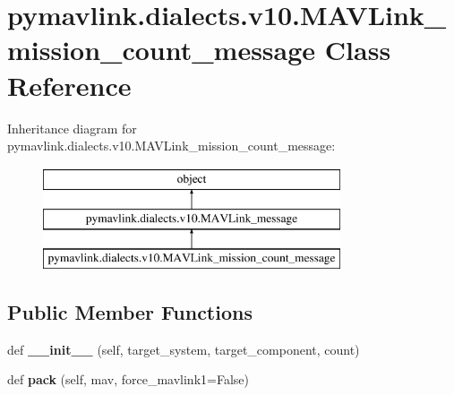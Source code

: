 \hypertarget{classpymavlink_1_1dialects_1_1v10_1_1MAVLink__mission__count__message}{}\section{pymavlink.\+dialects.\+v10.\+M\+A\+V\+Link\+\_\+mission\+\_\+count\+\_\+message Class Reference}
\label{classpymavlink_1_1dialects_1_1v10_1_1MAVLink__mission__count__message}
Inheritance diagram for pymavlink.\+dialects.\+v10.\+M\+A\+V\+Link\+\_\+mission\+\_\+count\+\_\+message\+:\begin{figure}[H]
\begin{center}
\leavevmode
\includegraphics[height=3.000000cm]{classpymavlink_1_1dialects_1_1v10_1_1MAVLink__mission__count__message}
\end{center}
\end{figure}
\subsection*{Public Member Functions}
\begin{DoxyCompactItemize}
\item 
\mbox{\label{classpymavlink_1_1dialects_1_1v10_1_1MAVLink__mission__count__message_af4e33ae1362a3733e0ce38b47426a87d}} 
def {\bfseries \+\_\+\+\_\+init\+\_\+\+\_\+} (self, target\+\_\+system, target\+\_\+component, count)
\item 
\mbox{\label{classpymavlink_1_1dialects_1_1v10_1_1MAVLink__mission__count__message_a17453b7888a917d6a9b5ce65e692b48c}} 
def {\bfseries pack} (self, mav, force\+\_\+mavlink1=False)
\end{DoxyCompactItemize}
